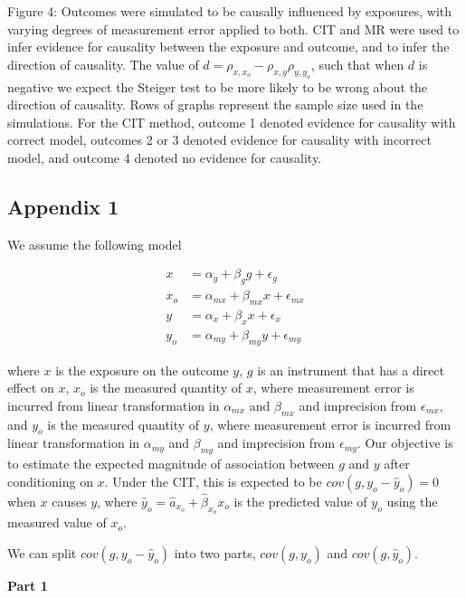 \documentclass[]{article}
\begin{document}
Figure 4: Outcomes were simulated to be causally influenced by
exposures, with varying degrees of measurement error applied to both.
CIT and MR were used to infer evidence for causality between the
exposure and outcome, and to infer the direction of causality. The value
of \(d = \rho_{x, x_o} - \rho_{x,y}\rho_{y,y_o}\), such that when \(d\)
is negative we expect the Steiger test to be more likely to be wrong
about the direction of causality. Rows of graphs represent the sample
size used in the simulations. For the CIT method, outcome 1 denoted
evidence for causality with correct model, outcomes 2 or 3 denoted
evidence for causality with incorrect model, and outcome 4 denoted no
evidence for causality.

\newpage

\subsection{Appendix 1}\label{appendix-1}

We assume the following model

\[
\begin{aligned}
x   & = \alpha_g + \beta_g g + \epsilon_g \\
x_o & = \alpha_{mx} + \beta_{mx} x + \epsilon_{mx} \\
y   & = \alpha_x + \beta_x x + \epsilon_x \\
y_o & = \alpha_{my} + \beta_{my} y + \epsilon_{my}
\end{aligned}
\]

where \(x\) is the exposure on the outcome \(y\), \(g\) is an instrument
that has a direct effect on \(x\), \(x_o\) is the measured quantity of
\(x\), where measurement error is incurred from linear transformation in
\(\alpha_{mx}\) and \(\beta_{mx}\) and imprecision from
\(\epsilon_{mx}\), and \(y_o\) is the measured quantity of \(y\), where
measurement error is incurred from linear transformation in
\(\alpha_{my}\) and \(\beta_{my}\) and imprecision from
\(\epsilon_{my}\). Our objective is to estimate the expected magnitude
of association between \(g\) and \(y\) after conditioning on \(x\).
Under the CIT, this is expected to be \(cov(g, y_o - \hat{y}_o) = 0\)
when \(x\) causes \(y\), where
\(\hat{y}_o = \hat{a}_{x_o} + \hat{\beta}_{x_o} x_o\) is the predicted
value of \(y_o\) using the measured value of \(x_o\).

We can split \(cov(g, y_o - \hat{y}_o)\) into two parts, \(cov(g, y_o)\)
and \(cov(g, \hat{y}_o)\).

\textbf{Part 1}
\end{document}
